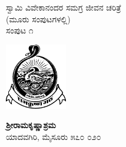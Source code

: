 \thispagestyle{empty}

\begin{center}
ಸ್ವಾಮಿ ವಿವೇಕಾನಂದರ ಸಮಗ್ರ ಜೀವನ ಚರಿತ್ರೆ\\(ಮೂರು ಸಂಪುಟಗಳಲ್ಲಿ)\\ಸಂಪುಟ ೧
\end{center}



\begin{center}
\includegraphics{"images/logo.png"}
\end{center}

\begin{center}
\textbf{ಶ್ರೀರಾಮಕೃಷ್ಣಾಶ್ರಮ}\\ಯಾದವಗಿರಿ, ಮೈಸೂರು ೫೭೦ ೦೨೦
\end{center}

